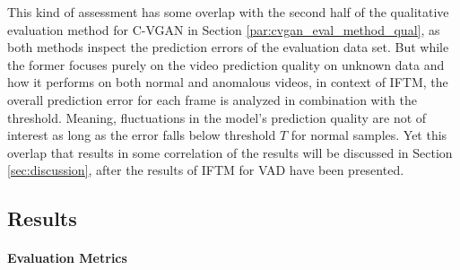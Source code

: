 This kind of assessment has some overlap with the second half of the qualitative evaluation method for C-VGAN in Section \ref{par:cvgan_eval_method_qual}, as both methods inspect the prediction errors of the evaluation data set. But while the former focuses purely on the video prediction quality on unknown data and how it performs on both normal and anomalous videos, in context of IFTM, the overall prediction error for each frame is analyzed in combination with the threshold. Meaning, fluctuations in the model's prediction quality are not of interest as long as the error falls below threshold $T$ for normal samples. Yet this overlap that results in some correlation of the results will be discussed in Section \ref{sec:discussion}, after the results of IFTM for VAD have been presented.


\subsection{Results} \label{subsec:vad_results} %

\paragraph{Evaluation Metrics}


